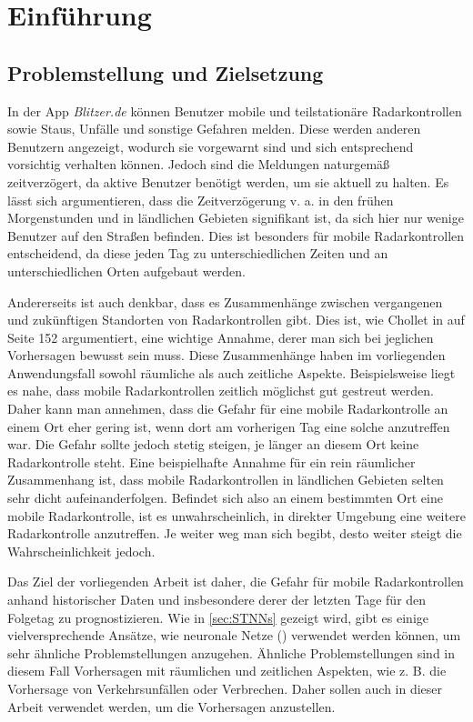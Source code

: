 \section{Einführung}
\label{sec:Einführung}

\subsection{Problemstellung und Zielsetzung}
\label{sec:Problemstellung}
In der App \emph{Blitzer.de} können Benutzer mobile und teilstationäre Radarkontrollen sowie Staus, Unfälle und sonstige Gefahren melden.
Diese werden anderen Benutzern angezeigt, wodurch sie vorgewarnt sind und sich entsprechend vorsichtig verhalten können.
Jedoch sind die Meldungen naturgemäß zeitverzögert, da aktive Benutzer benötigt werden, um sie aktuell zu halten.
Es lässt sich argumentieren, dass die Zeitverzögerung v. a. in den frühen Morgenstunden und in ländlichen Gebieten signifikant ist,
da sich hier nur wenige Benutzer auf den Straßen befinden.
Dies ist besonders für mobile Radarkontrollen entscheidend, da diese jeden Tag zu unterschiedlichen Zeiten und an unterschiedlichen Orten aufgebaut werden.

Andererseits ist auch denkbar, dass es Zusammenhänge zwischen vergangenen und zukünftigen Standorten von Radarkontrollen gibt.
Dies ist, wie Chollet in \cite{DeepLearningPythonKeras} auf Seite 152 argumentiert, eine wichtige Annahme, derer man sich bei jeglichen Vorhersagen bewusst sein muss.
Diese Zusammenhänge haben im vorliegenden Anwendungsfall sowohl räumliche als auch zeitliche Aspekte.
Beispielsweise liegt es nahe, dass mobile Radarkontrollen zeitlich möglichst gut gestreut werden.
Daher kann man annehmen, dass die Gefahr für eine mobile Radarkontrolle an einem Ort eher gering ist, wenn dort am vorherigen Tag eine solche anzutreffen war.
Die Gefahr sollte jedoch stetig steigen, je länger an diesem Ort keine Radarkontrolle steht.
Eine beispielhafte Annahme für ein rein räumlicher Zusammenhang ist, dass mobile Radarkontrollen in ländlichen Gebieten selten sehr dicht aufeinanderfolgen.
Befindet sich also an einem bestimmten Ort eine mobile Radarkontrolle, ist es unwahrscheinlich, in direkter Umgebung eine weitere Radarkontrolle anzutreffen.
Je weiter weg man sich begibt, desto weiter steigt die Wahrscheinlichkeit jedoch.

Das Ziel der vorliegenden Arbeit ist daher, die Gefahr für mobile Radarkontrollen anhand historischer Daten und insbesondere derer der letzten Tage für den Folgetag zu prognostizieren.
Wie in \autoref{sec:STNNs} gezeigt wird, gibt es einige vielversprechende Ansätze, wie neuronale Netze () verwendet werden können, um sehr ähnliche Problemstellungen anzugehen.
Ähnliche Problemstellungen sind in diesem Fall Vorhersagen mit räumlichen und zeitlichen Aspekten, wie z. B. die Vorhersage von Verkehrsunfällen oder Verbrechen.
Daher sollen auch in dieser Arbeit  verwendet werden, um die Vorhersagen anzustellen.

